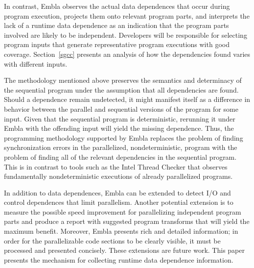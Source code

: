 In contrast, Embla
observes the actual data dependences that occur during program
execution, projects them onto relevant program parts, and interprets the
lack of a runtime data dependence as an indication that the program
parts involved are likely to be independent.
Developers will be responsible for selecting
program inputs that generate representative program executions with
good coverage. Section~\ref{sgcc} presents an analysis of how the
dependencies found varies with different inputs.

The methodology mentioned above preserves the
semantics and determinacy of the sequential program under the
assumption that all dependencies are found.  Should a dependence
remain undetected, it might manifest itself as a difference in
behavior between the parallel and sequential versions of the program
for some input. Given that the sequential program is deterministic,
rerunning it under Embla with the offending input will yield the
missing dependence.  Thus, the programming methodology supported by
Embla replaces the problem of finding synchronization errors in the
parallelized, nondeterministic, program with the problem of finding
all of the relevant dependencies in the sequential program.
This is in contrast to tools such as the Intel Thread Checker that
observes fundamentally nondeterministic executions of already 
parallelized programs.

In addition to data dependences, Embla can be extended to
detect I/O and control dependences that limit parallelism.  Another potential
extension is to measure the possible speed
improvement for parallelizing independent program parts and produce a
report with suggested program transforms that will yield the maximum
benefit.  Moreover, Embla presents rich and detailed information; in order
for the parallelizable code sections to be clearly visible, it must be
processed and presented concisely.  These extensions are future work.
This paper
presents the mechanism for collecting runtime data dependence information.

